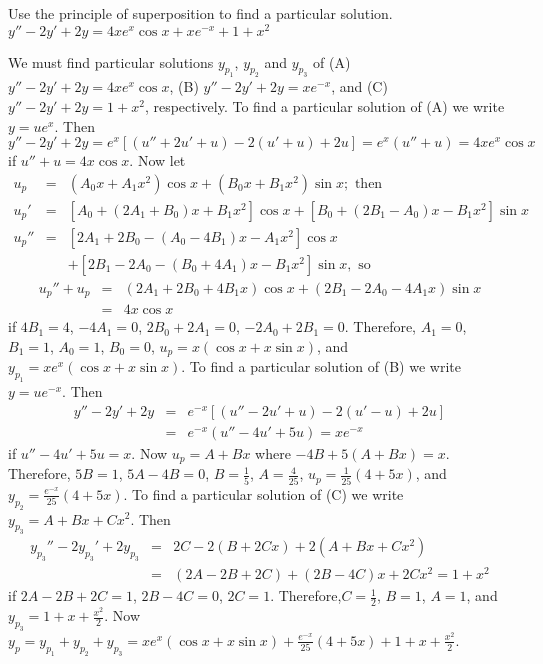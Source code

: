 \documentclass{ximera}
\begin{document}
\begin{problem}\label{exer:5.5.30} Use the
principle
of superposition to find a particular solution. $y''-2y'+2y=4xe^x\cos x+xe^{-x}+1+x^2$

\begin{solution}
    We must find particular solutions $y_{p_1}$, $y_{p_2}$ and $y_{p_3}$
of
(A) $y''-2y'+2y=4xe^x\cos x$,
(B) $y''-2y'+2y=xe^{-x}$, and
(C) $y''-2y'+2y=1+x^2$, respectively.
To find a particular solution of (A) we write $y=ue^x$. Then
$y''-2y'+2y=e^x\left[(u''+2u'+u)-2(u'+u)+2u\right]=e^x(u''+u)=
4xe^x\cos x$ if $u''+u=4x\cos x$. Now let
\begin{eqnarray*}
u_p&=&(A_0x+A_1x^2)\cos x+(B_0x+B_1x^2)\sin x;\mbox{ then}\\
u_p'&=&\left[A_0+(2A_1+B_0)x+B_1x^2\right]\cos x
+\left[B_0+(2B_1-A_0)x-B_1x^2\right]\sin x\\
u_p''&=&
\left[2A_1+2B_0-(A_0-4B_1)x-A_1x^2\right]\cos x\\ &&+
\left[2B_1-2A_0-(B_0+4A_1)x-B_1x^2\right]\sin x, \mbox{ so}
\end{eqnarray*}
\begin{eqnarray*}
u_p''+u_p&=&(2A_1+2B_0+4B_1x)\cos x+(2B_1-2A_0-4A_1x)\sin x\\ &=&
4x\cos x
\end{eqnarray*}
if $4B_1=4$, $-4A_1=0$, $2B_0+2A_1=0$, $-2A_0+2B_1=0$. Therefore,
$A_1=0$, $B_1=1$, $A_0=1$, $B_0=0$, $u_p=x(\cos x+x\sin x)$, and
$y_{p_1}=xe^x(\cos x+x\sin x)$. To find a particular solution of (B)
we write $y=ue^{-x}$. Then
\begin{eqnarray*}
y''-2y'+2y&=&e^{-x}\left[(u''-2u'+u)-2(u'-u)+2u\right]\\ &=&
e^{-x}(u''-4u'+5u)=xe^{-x}
\end{eqnarray*}
if $u''-4u'+5u=x$. Now $u_p=A+Bx$ where $-4B+5(A+Bx)=x$. Therefore,
$5B=1$, $5A-4B=0$, $B=\frac{1}{5}$, $A=\frac{4}{25}$,
$u_p=\frac{1}{25}(4+5x)$, and $y_{p_2}=\frac{e^{-x}}{25}(4+5x)$.
To find a particular solution of (C) we write $y_{p_3}=A+Bx+Cx^2$.
Then
\begin{eqnarray*}
y_{p_3}''-2y_{p_3}'+2y_{p_3}&=&2C-2(B+2Cx)+2(A+Bx+Cx^2)\\ &=&
(2A-2B+2C)+(2B-4C)x+2Cx^2=1+x^2
\end{eqnarray*}
if $2A-2B+2C=1$, $2B-4C=0$, $2C=1$. Therefore,$C=\frac{1}{2}$,
$B=1$, $A=1$, and $y_{p_3}=1+x+\frac{x^2}{2}$. Now
$y_p=y_{p_1}+y_{p_2}+y_{p_3}= xe^x(\cos x+x\sin
x)+\frac{e^{-x}}{25}(4+5x)+1+x+\frac{x^2}{2}$.
\end{solution}
\end{problem}
\end{document}
